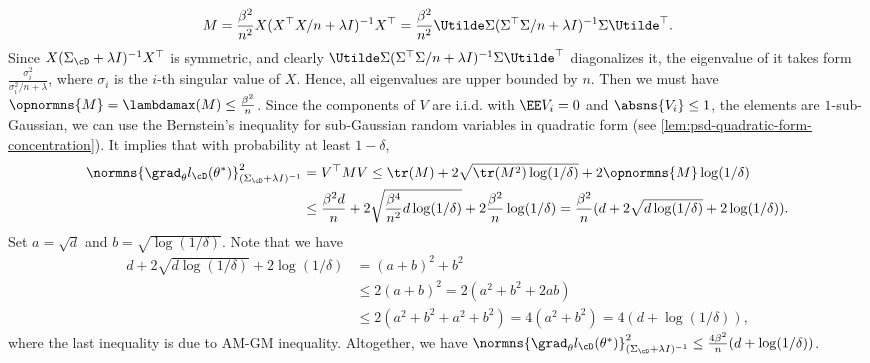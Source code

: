 \begin{equation*}
    M = \frac{\beta^2}{n^2} X(X^{\top}X/n+\lambda I)^{-1}X^{\top} = \frac{\beta^2}{n^2} \Utilde \Sigma(\Sigma^{\top}\Sigma/n+\lambda I)^{-1}\Sigma \Utilde^{\top}.
\end{equation*}
Since $X(\Sigma_{\cD}+\lambda I)^{-1}X^{\top}$ is symmetric, and clearly $\Utilde \Sigma(\Sigma^{\top}\Sigma/n+\lambda I)^{-1}\Sigma \Utilde^{\top}$ diagonalizes it, the eigenvalue of it takes form $\frac{\sigma_i^2}{\sigma_i^2/n+\lambda}$, where $\sigma_i$ is the $i$-th singular value of $X$. Hence, all eigenvalues are upper bounded by $n$. Then we must have $\opnormns{M}=\lambdamax(M) \leq \frac{\beta^2}{n}$. Since the components of $V$ are i.i.d. with $\EE V_i=0$ and $\absns{V_i}\leq 1$, the elements are $1$-sub-Gaussian, we can use the Bernstein's inequality for sub-Gaussian random variables in quadratic form (see \cref{lem:psd-quadratic-form-concentration}). It implies that with probability at least $1-\delta$, 
\begin{align*}
    \normns{\grad_\theta l_{\cD}(\theta^*)}_{(\Sigma_{\cD}+\lambda I)^{-1}}^2 &= V^{\top}MV \leq \tr(M) + 2\sqrt{\tr(M^2)\log(1/\delta)} + 2\opnormns{M}\log(1/\delta) \\
    &\leq \frac{\beta^2 d}{n} + 2\sqrt{\frac{\beta^4}{n^2} d \log(1/\delta)} + 2\frac{\beta^2}{n}\log(1/\delta) = \frac{\beta^2}{n} (d + 2\sqrt{d\log(1/\delta)} + 2\log(1/\delta)).
\end{align*}
Set $a= \sqrt{d}$ and $b=\sqrt{\log(1/\delta)}$. Note that we have
\begin{align*}
    d + 2\sqrt{d\log(1/\delta)} + 2\log(1/\delta) &= (a+b)^2 + b^2 \\
    &\leq 2(a+b)^2 = 2 (a^2+b^2+2ab) \\
    &\leq 2 (a^2+b^2 + a^2+ b^2) = 4 (a^2+b^2) = 4(d + \log(1/\delta)),
\end{align*}
where the last inequality is due to AM-GM inequality. Altogether, we have $\normns{\grad_\theta l_{\cD}(\theta^*)}_{(\Sigma_{\cD}+\lambda I)^{-1}}^2 \leq \frac{4\beta^2}{n}(d+\log(1/\delta))$. 

